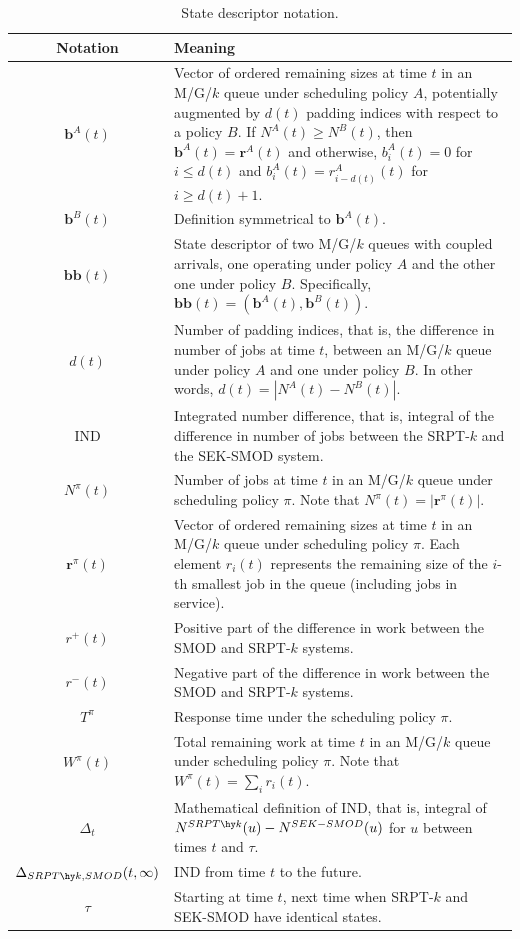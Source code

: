 \documentclass[acmsmall]{acmart}
\newcommand{\rb}{\boldsymbol{r}}
\newcommand{\bb}{\boldsymbol{b}}
\newcommand{\bbb}{\bb\bb}
\begin{document}
\renewcommand{\arraystretch}{1.2}
\begin{table}
  \caption{State descriptor notation.}
  \label{tab:notation-states}
  \begin{tabular}{cp{10cm}}
    \toprule
    Notation & Meaning \\
    \midrule
    $\bb^A(t)$ & Vector of ordered remaining sizes at time $t$ in an M/G/$k$ queue under scheduling policy $A$, potentially augmented by $d(t)$ padding indices with respect to a policy $B$. If $N^A(t)\geq N^B(t)$, then $\bb^A(t)=\rb^A(t)$ and otherwise, $b^A_i(t)=0$ for $i\leq d(t)$ and $b^A_i(t)=r^A_{i-d(t)}(t)$ for $i\geq d(t)+1$. \\
    $\bb^B(t)$ & Definition symmetrical to $\bb^A(t)$. \\
    $\bbb(t)$ & State descriptor of two M/G/$k$ queues with coupled arrivals, one operating under policy $A$ and the other one under policy $B$. Specifically, $\bbb(t)=(\bb^A(t), \bb^B(t))$. \\
    $d(t)$ & Number of padding indices, that is, the difference in number of jobs at time $t$, between an M/G/$k$ queue under policy $A$ and one under policy $B$. In other words, $d(t)=|N^A(t)-N^B(t)|$.\\
    IND & Integrated number difference, that is, integral of the difference in number of jobs between the SRPT-$k$ and the SEK-SMOD system. \\
    $N^\pi(t)$ & Number of jobs at time $t$ in an M/G/$k$ queue under scheduling policy $\pi$. Note that $N^\pi(t)=|\rb^\pi(t)|$. \\
    $\rb^\pi (t)$ & Vector of ordered remaining sizes at time $t$ in an M/G/$k$ queue under scheduling policy $\pi$. Each element $r_i(t)$ represents the remaining size of the $i$-th smallest job in the queue (including jobs in service). \\
    $r^+(t)$ & Positive part of the difference in work between the SMOD and SRPT-$k$ systems. \\
    $r^-(t)$ & Negative part of the difference in work between the SMOD and SRPT-$k$ systems. \\
    $T^\pi$ & Response time under the scheduling policy $\pi$.  \\
    $W^\pi(t)$ & Total remaining work at time $t$ in an M/G/$k$ queue under scheduling policy $\pi$. Note that $W^\pi(t)=\sum_i r_i(t)$. \\
    $\Delta_t$ & Mathematical definition of IND, that is, integral of $N^{SRPT\hy k}(u)-N^{SEK-SMOD}(u)$ for $u$ between times $t$ and $\tau$. \\
    $\Delta_{SRPT\hy k,SMOD}(t,\infty)$ & IND from time $t$ to the future. \\
    $\tau$ & Starting at time $t$, next time when SRPT-$k$ and SEK-SMOD have identical states. \\
    \bottomrule
  \end{tabular}
\end{table}
\end{document}

